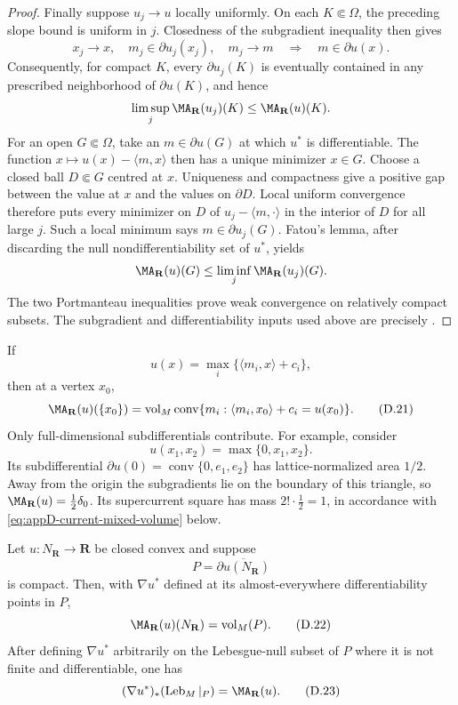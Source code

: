 \begin{proof}
Finally suppose \(u_j\to u\) locally uniformly.  On each
\(K\Subset\Omega\), the preceding slope bound is uniform in \(j\).
Closedness of the subgradient inequality then gives
\[
 x_j\to x,\quad m_j\in\partial u_j(x_j),\quad m_j\to m
       \quad\Longrightarrow\quad m\in\partial u(x).
\]
Consequently, for compact \(K\), every \(\partial u_j(K)\) is eventually
contained in any prescribed neighborhood of \(\partial u(K)\), and hence
\[
 \limsup_j\MA_{\mathbf R}(u_j)(K)
       \leq\MA_{\mathbf R}(u)(K).
\]
For an open \(G\Subset\Omega\), take an \(m\in\partial u(G)\) at which
\(u^*\) is differentiable.  The function
\(x\mapsto u(x)-\langle m,x\rangle\) then has a unique minimizer
\(x\in G\).  Choose a closed ball \(D\Subset G\) centred at \(x\).
Uniqueness and compactness give a positive gap between the value at \(x\)
and the values on \(\partial D\).  Local uniform convergence therefore
puts every minimizer on \(D\) of
\(u_j-\langle m,\cdot\rangle\) in the interior of \(D\) for all large
\(j\).  Such a local minimum says \(m\in\partial u_j(G)\).  Fatou's
lemma, after discarding the null
nondifferentiability set of \(u^*\), yields
\[
 \MA_{\mathbf R}(u)(G)
       \leq\liminf_j\MA_{\mathbf R}(u_j)(G).
\]
The two Portmanteau inequalities prove weak convergence on relatively
compact subsets.  The subgradient and differentiability inputs used above
are precisely \cite[Theorems~24.5 and~25.5]{Roc70}.
\end{proof}

\begin{example}
\label{ex:appD-polyhedral-atom}
If
\[
 u(x)=\max_i\{\langle m_i,x\rangle+c_i\},
\]
then at a vertex \(x_0\),
\[
 \MA_{\mathbf R}(u)(\{x_0\})
 =
 \operatorname{vol}_M
 \operatorname{conv}\{m_i:
 \langle m_i,x_0\rangle+c_i=u(x_0)\}.
\tag{D.21}\label{eq:appD-polyhedral-atom}
\]
Only full-dimensional subdifferentials contribute.
For example, consider
\[
 u(x_1,x_2)=\max\{0,x_1,x_2\}.
\]
Its subdifferential \(\partial u(0)=\operatorname{conv}\{0,e_1,e_2\}\)
has lattice-normalized area \(1/2\).  Away from the origin the subgradients lie on the boundary
of this triangle, so \(\MA_{\mathbf R}(u)=\tfrac12\delta_0\).
Its supercurrent square has mass \(2!\cdot\tfrac12=1\), in accordance
with \eqref{eq:appD-current-mixed-volume} below.
\end{example}

\begin{proposition}\label{prop:appD-legendre-pushforward}
Let \(u:N_{\mathbf R}\to\mathbf R\) be closed convex and suppose
\[
 P=\overline{\partial u(N_{\mathbf R})}
\]
is compact.
Then, with \(\nabla u^*\) defined at its almost-everywhere differentiability
points in \(P\),
\[
 \MA_{\mathbf R}(u)(N_{\mathbf R})=\operatorname{vol}_M(P).
\tag{D.22}\label{eq:appD-real-ma-mass}
\]
After defining \(\nabla u^*\) arbitrarily on the Lebesgue-null subset of
\(P\) where it is not finite and differentiable, one has
\[
 (\nabla u^*)_*(\operatorname{Leb}_M|_P)
 =\MA_{\mathbf R}(u).
\tag{D.23}\label{eq:appD-legendre-pushforward}
\]
\end{proposition}

